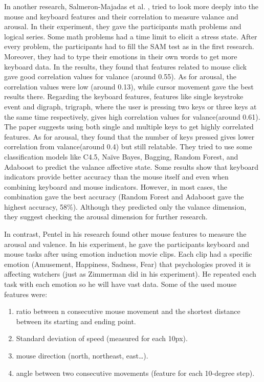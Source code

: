 \documentclass[../main.tex]{subfiles}
\begin{document}
In another research, Salmeron-Majadas et al. \cite{An_Evaluation_Of_Mouse_And_Keyboard_Interaction}, tried to look more 
deeply into the mouse and keyboard features and their correlation to measure valance and arousal. 
In their experiment, they gave the participants math problems and logical series. 
Some math problems had a time limit to elicit a stress state. 
After every problem, the participants had to fill the SAM test as in the first research. 
Moreover, they had to type their emotions in their own words to get more keyboard data. 
In the results, they found that features related to mouse click gave good correlation values 
for valance (around 0.55). As for arousal, the correlation values were low (around 0.13), 
while cursor movement gave the best results there. Regarding the keyboard features, 
features like single keystroke event and digraph, trigraph, where the user is pressing two keys or 
three keys at the same time respectively, gives high correlation values for valance(around 0.61). 
The paper suggests using both single and multiple keys to get highly correlated features. 
As for arousal, they found that the number of keys pressed gives lower correlation from 
valance(around 0.4) but still relatable. They tried to use some classification models like C4.5, 
Naïve Bayes, Bagging, Random Forest, and Adaboost to predict the valance affective state. 
Some results show that keyboard indicators provide better accuracy than the mouse itself and even 
when combining keyboard and mouse indicators. However, in most cases, the combination gave the best 
accuracy (Random Forest and Adaboost gave the highest accuracy, 58\%). 
Although they predicted only the valance dimension, they suggest checking the arousal 
dimension for further research.
\par

In contrast, Pentel in his research \cite{Pentel} found other mouse features to measure the arousal 
and valence.  In his experiment, he gave the participants keyboard and mouse tasks after using 
emotion induction movie clips. 
Each clip had a specific emotion (Amusement, Happiness, Sadness, Fear) that psychologies proved 
it is affecting watchers (just as Zimmerman did in his experiment). 
He repeated each task with each emotion so he will have vast data. 
Some of the used mouse features were:

\begin{samepage}
\begin{enumerate}[i]
    \item ratio between n consecutive mouse movement and the shortest distance between its starting and ending point. 
    \item Standard deviation of speed (measured for each 10px).
    \item mouse direction (north, northeast, east…). 
    \item angle between two consecutive movements (feature for each 10-degree step).
\end{enumerate}  
\end{samepage}
\end{document}
